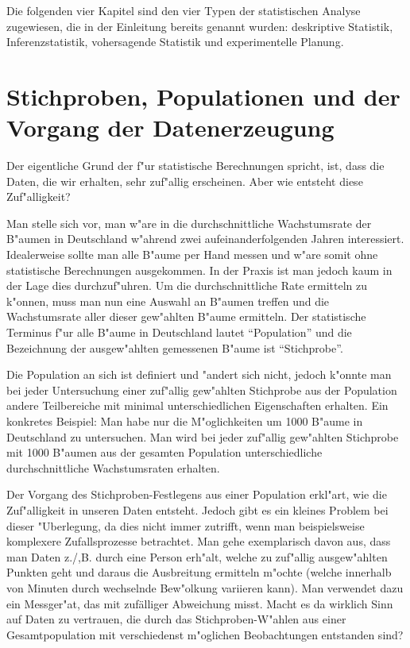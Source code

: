 \documentclass[a4paper,twoside]{tufte-book}\usepackage[]{graphicx}\usepackage[]{color}
\begin{document}
Die folgenden vier Kapitel sind den vier Typen der statistischen Analyse zugewiesen, die in der Einleitung bereits genannt wurden: deskriptive Statistik, Inferenzstatistik, vohersagende Statistik und experimentelle Planung. 

\section{Stichproben, Populationen und der Vorgang der Datenerzeugung}

Der eigentliche Grund der f"ur statistische Berechnungen spricht, ist, dass die Daten, die wir erhalten, sehr zuf"allig erscheinen. Aber wie entsteht diese Zuf"alligkeit?

Man stelle sich vor,  man w"are in die durchschnittliche Wachstumsrate der B"aumen in Deutschland w"ahrend zwei aufeinanderfolgenden Jahren interessiert. Idealerweise sollte man alle B"aume per Hand messen und w"are somit ohne statistische Berechnungen ausgekommen. In der Praxis ist man jedoch kaum in der Lage dies durchzuf"uhren. Um die durchschnittliche Rate ermitteln zu k"onnen, muss man nun eine Auswahl an B"aumen treffen und die Wachstumsrate aller dieser gew"ahlten B"aume ermitteln. Der statistische Terminus f"ur alle B"aume in Deutschland lautet "`Population"' und die Bezeichnung der ausgew"ahlten gemessenen B"aume ist "`Stichprobe"'.

Die  Population an sich ist definiert und "andert sich nicht, jedoch k"onnte man bei jeder Untersuchung einer zuf"allig gew"ahlten Stichprobe aus der Population andere Teilbereiche mit minimal unterschiedlichen Eigenschaften erhalten. Ein konkretes Beispiel: Man habe nur die M"oglichkeiten um 1000 B"aume in Deutschland zu untersuchen. Man wird bei jeder zuf"allig gew"ahlten Stichprobe mit 1000 B"aumen aus der gesamten Population unterschiedliche durchschnittliche Wachstumsraten erhalten.

Der Vorgang des Stichproben-Festlegens aus einer Population erkl"art, wie die Zuf"alligkeit in unseren Daten entsteht. Jedoch gibt es ein kleines Problem bei dieser "Uberlegung, da dies nicht immer zutrifft, wenn man beispielsweise komplexere Zufallsprozesse betrachtet. Man gehe exemplarisch davon aus, dass man Daten z./,B. durch eine Person erh"alt, welche zu zuf"allig ausgew"ahlten Punkten geht und daraus die Ausbreitung ermitteln m"ochte (welche innerhalb von Minuten durch wechselnde Bew"olkung variieren kann). Man verwendet dazu ein Messger"at, das mit zufälliger Abweichung misst. Macht es da wirklich Sinn auf Daten zu vertrauen, die durch das Stichproben-W"ahlen aus einer Gesamtpopulation mit verschiedenst m"oglichen Beobachtungen entstanden sind?
\end{document}
